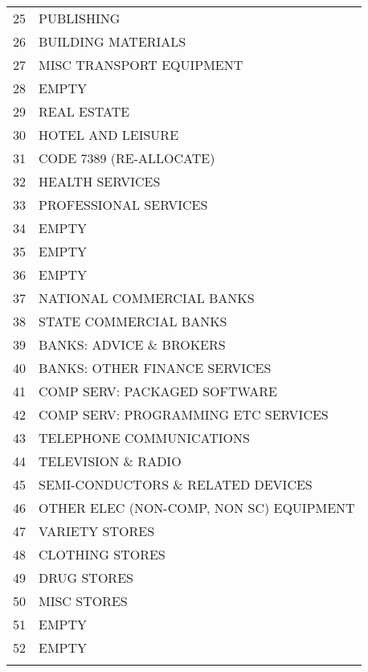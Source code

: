 \begin{table}[H]
\begin{tabular}{ll}
25            & PUBLISHING                              \\
26            & BUILDING MATERIALS                      \\
27            & MISC TRANSPORT EQUIPMENT                \\
28            & EMPTY                                   \\
29            & REAL ESTATE                             \\
30            & HOTEL AND LEISURE                       \\
31            & CODE 7389 (RE-ALLOCATE)                 \\
32            & HEALTH SERVICES                         \\
33            & PROFESSIONAL SERVICES                   \\
34            & EMPTY                                   \\
35            & EMPTY                                   \\
36            & EMPTY                                   \\
37            & NATIONAL COMMERCIAL BANKS               \\
38            & STATE COMMERCIAL BANKS                  \\
39            & BANKS: ADVICE \& BROKERS                \\
40            & BANKS: OTHER FINANCE SERVICES           \\
41            & COMP SERV: PACKAGED SOFTWARE            \\
42            & COMP SERV: PROGRAMMING ETC SERVICES     \\
43            & TELEPHONE COMMUNICATIONS                \\
44            & TELEVISION \& RADIO                     \\
45            & SEMI-CONDUCTORS \& RELATED DEVICES      \\
46            & OTHER ELEC (NON-COMP, NON SC) EQUIPMENT \\
47            & VARIETY STORES                          \\
48            & CLOTHING STORES                         \\
49            & DRUG STORES                             \\
50            & MISC STORES                             \\
51            & EMPTY                                   \\
52            & EMPTY                                   \\
              &                                        
\end{tabular}
\end{table}
